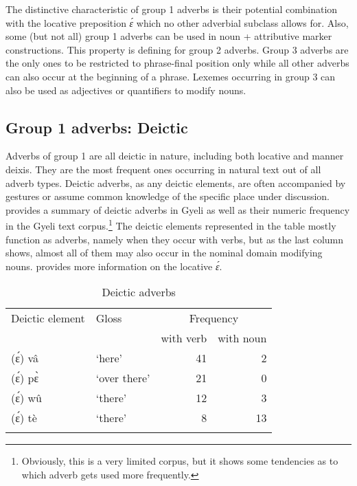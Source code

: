 The distinctive characteristic of group 1 adverbs is their potential combination with the locative preposition {\itshape ɛ́} which no other adverbial subclass allows for. Also, some (but not all) group 1 adverbs can be used in noun + attributive marker constructions. This property is defining for group 2 adverbs. Group 3 adverbs are the only ones to be restricted to phrase-final position only while all other adverbs can also occur at the beginning of a phrase. Lexemes occurring in group 3 can also be used as adjectives or quantifiers to modify nouns. 




\subsection{Group 1 adverbs: Deictic} 
\label{sec:G1ADV}

Adverbs of group 1 are all deictic in nature, including both locative and manner deixis. They are the most frequent ones occurring in natural text out of all adverb types. 
Deictic adverbs, as any deictic elements, are often accompanied by gestures or assume  common knowledge of the specific place under discussion.  provides a summary of deictic adverbs in Gyeli as well as their numeric frequency in the Gyeli text corpus.\footnote{Obviously, this is a very limited corpus, but it shows some tendencies as to which adverb gets used more frequently.} The deictic elements represented in the table mostly function as adverbs, namely when they occur with verbs, but as the last column shows, almost all of them may also occur in the nominal domain modifying nouns.   provides more information on the locative {\itshape ɛ́}.

\begin{table}
\begin{tabular}{llrr}
\lsptoprule
Deictic element & Gloss & \multicolumn{2}{c}{Frequency} \\\cmidrule(lr){3-4}
                        &            &        with verb  & with noun \\
                        \midrule
(ɛ́) vâ & `here' & 41 & 2 \\
(ɛ́) pɛ̀ & `over there' & 21 & 0 \\
(ɛ́) wû & `there' & 12 & 3 \\ 
(ɛ́) tè & `there' & 8 & 13 \\
\lspbottomrule
\end{tabular}
\caption{Deictic adverbs}
\label{Tab:DeicAdv}
\end{table} 



